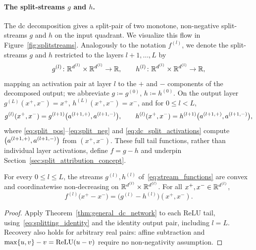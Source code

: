 \paragraph{The split-streams $g$ and $h$.}
The \ac{dc} decomposition gives a split-pair of two monotone, non-negative split-streams $g$ and $h$ on the input quadrant. We visualize this flow in Figure~\ref{fig:splitstreams}. Analogously to the notation $f^{(l)}$, we denote the split-streams $g$ and $h$ restricted to the layers $l+1,\dots,L$ by
\begin{equation}
	g^{(l)} \colon \mathbb{R}^{d^{(l)}} \times \mathbb{R}^{d^{(l)}} \to \mathbb{R},
	\qquad
	h^{(l)} \colon \mathbb{R}^{d^{(l)}} \times \mathbb{R}^{d^{(l)}} \to \mathbb{R},
	\label{eq:stream_functions}
\end{equation}
mapping an activation pair at layer $l$ to the $+$ and $-$ components of the decomposed output; we abbreviate $g \coloneqq g^{(0)}$, $h \coloneqq h^{(0)}$. On the output layer $g^{(L)}(x^+, x^-) = x^+$, $h^{(L)}(x^+, x^-) = x^-$, and for $0 \le l < L$,
\begin{equation}
	g^{(l)}(x^+, x^-) = g^{(l+1)}\bigl(a^{(l+1,+)}, a^{(l+1,-)}\bigr),
	\qquad
	h^{(l)}(x^+, x^-) = h^{(l+1)}\bigl(a^{(l+1,+)}, a^{(l+1,-)}\bigr),
	\label{eq:stream_recursion}
\end{equation}
where \eqref{eq:split_pos}--\eqref{eq:split_neg} and \eqref{eq:dc_split_activations} compute $\bigl(a^{(l+1,+)}, a^{(l+1,-)}\bigr)$ from $(x^+,x^-)$. These full tail functions, rather than individual layer activations, define $f=g-h$ and underpin Section~\ref{sec:split_attribution_concept}.

\begin{theoremenv}\label{thm:split_correct}
For every $0\le l\le L$, the streams $g^{(l)},h^{(l)}$ of~\eqref{eq:stream_functions} are convex and coordinatewise non-decreasing on $\mathbb{R}^{d^{(l)}}\times\mathbb{R}^{d^{(l)}}$. For all $x^+,x^-\in\mathbb{R}^{d^{(l)}}$,
\begin{equation}
	f^{(l)}\bigl(x^+-x^-\bigr)=\bigl(g^{(l)}-h^{(l)}\bigr)(x^+,x^-).
	\label{eq:split_correctness}
\end{equation}
\end{theoremenv}
\begin{proof}
Apply Theorem~\ref{thm:general_dc_network} to each ReLU tail, using~\eqref{eq:splitting_identity} and the identity output pair, including $l=L$. Recovery also holds for arbitrary real pairs: affine subtraction and $\max\{u,v\}-v=\text{ReLU}(u-v)$ require no non-negativity assumption.
\end{proof}

